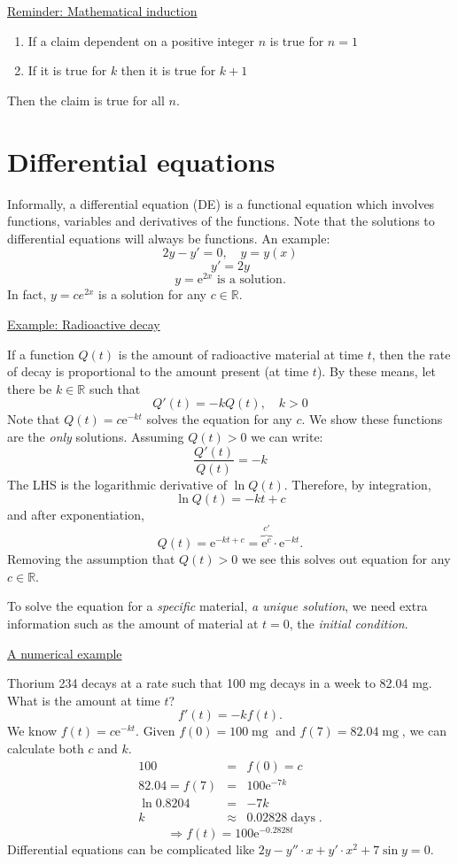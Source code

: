 \documentclass{article}
\newcommand{\mathe}{\mathrm{e}}
\newcommand{\nospace}{}
\newcommand{\tmem}[1]{{\em #1\/}}
\newcommand{\tmop}[1]{\ensuremath{\operatorname{#1}}}
\newenvironment{enumeratenumeric}{\begin{enumerate}[1.] }{\end{enumerate}}
\begin{document}
\begin{tmornamented}
  {\underline{Reminder: Mathematical induction}}
  \begin{enumeratenumeric}
    \item If a claim dependent on a positive integer $n$ is true for $n = 1$
    
    \item If it is true for $k$ then it is true for $k + 1$
  \end{enumeratenumeric}
  Then the claim is true for all $n$.
\end{tmornamented}

\part*{Differential equations}

Informally, a differential equation (DE) is a functional equation which
involves functions, variables and derivatives of the functions. Note that the
solutions to differential equations will always be functions. An example:
\[ 2 y - y' = 0, \quad y = y (x) \]
\[ y' = 2 y \]
\[ y = \mathe^{2 x} \nospace \nospace \text{ is a solution.} \]
In fact, $y = ce^{2 x}$ is a solution for any $c \in \mathbb{R}$.

{\underline{Example: Radioactive decay}}

If a function $Q (t)$ is the amount of radioactive material at time $t$, then
the rate of decay is proportional to the amount present (at time $t$). By
these means, let there be $k \in \mathbb{R}$ such that
\[ Q' (t) = - kQ (t), \quad k > 0 \]
Note that $Q (t) = c \mathe^{- kt}$ solves the equation for any $c$. We show
these functions are the {\tmem{only}} solutions. Assuming $Q (t) > 0$ we can
write:
\[ \frac{Q' (t)}{Q (t)} = - k \]
The LHS is the logarithmic derivative of $\ln Q (t)$. Therefore, by
integration,
\[ \ln Q (t) = - kt + c \]
and after exponentiation,
\[ Q (t) = \mathe^{- kt + c} = \overbrace{\mathe^c}^{c'} \cdot \mathe^{- kt} .
\]
Removing the assumption that $Q (t) > 0$ we see this solves out equation for
any $c \in \mathbb{R}$.

To solve the equation for a {\tmem{specific}} material, {\tmem{a unique
solution}}, we need extra information such as the amount of material at $t =
0$, the {\tmem{initial condition}}.

{\underline{A numerical example}}

Thorium 234 decays at a rate such that 100 mg decays in a week to 82.04 mg.
What is the amount at time $t$?
\[ f' (t) = - kf (t) . \]
We know $f (t) = c \mathe^{- kt}$. Given $f (0) = 100 \tmop{mg}$ and $f (7) =
82.04 \tmop{mg}$, we can calculate both $c$ and $k$.
\begin{eqnarray*}
  100 & = & f (0) = c\\
  82.04 = f (7) & = & 100 \mathe^{- 7 k}\\
  \ln 0.8204 & = & - 7 k\\
  k & \approx & 0.02828 \tmop{days} .
\end{eqnarray*}
\[ \Rightarrow f (t) = 100 \mathe^{- 0.2828 t} \]
Differential equations can be complicated like $2 y - y'' \cdot x + y' \cdot
x^2 + 7 \sin y = 0$.
\end{document}
